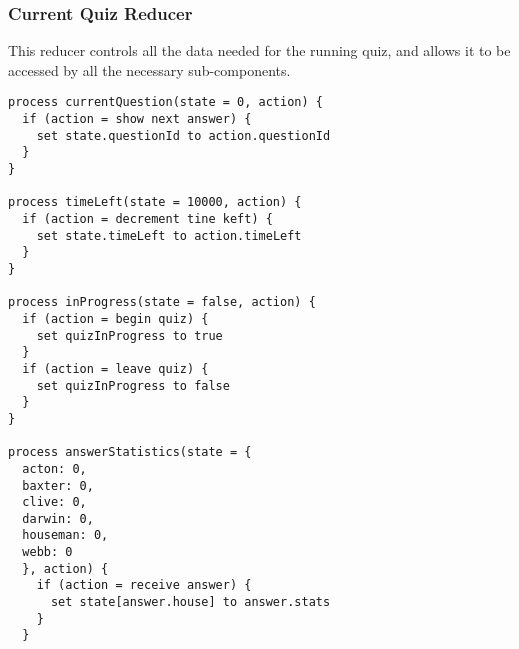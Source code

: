 \subsubsection{Current Quiz Reducer} %
\label{ssub:current_quiz_reducer}
This reducer controls all the data needed for the running quiz, and allows it to be accessed by all the necessary sub-components.

\begin{verbatim}
process currentQuestion(state = 0, action) {
  if (action = show next answer) {
    set state.questionId to action.questionId
  }
}

process timeLeft(state = 10000, action) {
  if (action = decrement tine keft) {
    set state.timeLeft to action.timeLeft
  }
}

process inProgress(state = false, action) {
  if (action = begin quiz) {
    set quizInProgress to true
  }
  if (action = leave quiz) {
    set quizInProgress to false
  }
}

process answerStatistics(state = {
  acton: 0,
  baxter: 0,
  clive: 0,
  darwin: 0,
  houseman: 0,
  webb: 0
  }, action) {
    if (action = receive answer) {
      set state[answer.house] to answer.stats
    }
  }
\end{verbatim}
